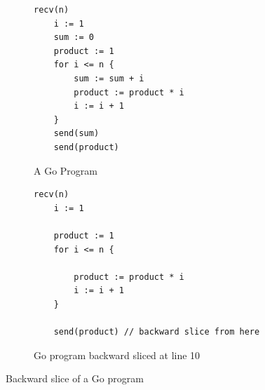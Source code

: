 \begin{figure}
\begin{minipage}{.45\textwidth}
\begin{subfigure}[b]{\linewidth}
\centering
 \begin{lstlisting}[]
	recv(n)
	i := 1
	sum := 0
	product := 1
	for i <= n {
		sum := sum + i
		product := product * i
		i := i + 1
	}
	send(sum)
	send(product)
\end{lstlisting}
        \vspace{-2mm}
                \caption{A Go Program}
        \end{subfigure}
\end{minipage}\hfill
\begin{minipage}{.45\textwidth}
\begin{subfigure}[b]{\linewidth}
\centering
\begin{lstlisting}[]
	recv(n)
	i := 1

	product := 1
	for i <= n {
		
		product := product * i
		i := i + 1
	}
	
	send(product) // backward slice from here
\end{lstlisting}
        \vspace{-2mm}
                \caption{Go program backward sliced at line 10}
        \end{subfigure}
        \end{minipage}\hfill
                        \caption{Backward slice of a Go program \cite{Tip} }
                \label{Fig:backslice}
\end{figure}



%
%
%		
%	


